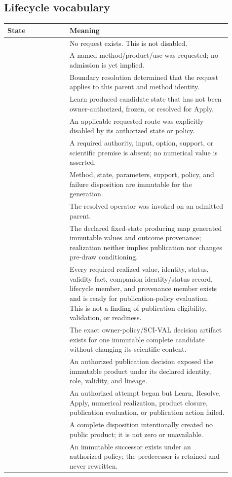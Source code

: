 \subsection{Lifecycle vocabulary}
\label{sec:lifecycle}

\begin{longtable}{p{0.25\linewidth}p{0.65\linewidth}}
\toprule
State & Meaning \\
\midrule
\endhead
\NotRequested{} & No request exists. This is not disabled. \\
\Requested{} & A named method/product/use was requested; no admission is yet
implied. \\
\Effective{} & Boundary resolution determined that the request applies to
this parent and method identity. \\
\LearnedCandidate{} & Learn produced candidate state that has not been
owner-authorized, frozen, or resolved for Apply. \\
\Disabled{} & An applicable requested route was explicitly disabled by its
authorized state or policy. \\
\Unavailable{} & A required authority, input, option, support, or scientific
premise is absent; no numerical value is asserted. \\
\Resolved{} & Method, state, parameters, support, policy, and failure
disposition are immutable for the generation. \\
\Applied{} & The resolved operator was invoked on an admitted parent. \\
\Realized{} & The declared fixed-state producing map generated immutable values
and outcome provenance; realization neither implies publication nor changes
pre-draw conditioning. \\
\Complete{} & Every required realized value, identity, status, validity fact,
companion identity/status record, lifecycle member, and provenance member
exists and is ready for publication-policy evaluation. This is not a finding
of publication eligibility, validation, or readiness. \\
\PublicationDecided{} & The exact owner-policy/SCI-VAL decision artifact exists
for one immutable complete candidate without changing its scientific content. \\
\Published{} & An authorized publication decision exposed the immutable
product under its declared identity, role, validity, and lineage. \\
\Failed{} & An authorized attempt began but Learn, Resolve, Apply, numerical
realization, product closure, publication evaluation, or publication action
failed. \\
\NotProduced{} & A complete disposition intentionally created no public
product; it is not zero or unavailable. \\
\Superseded{} & An immutable successor exists under an authorized policy; the
predecessor is retained and never rewritten. \\
\bottomrule
\end{longtable}

